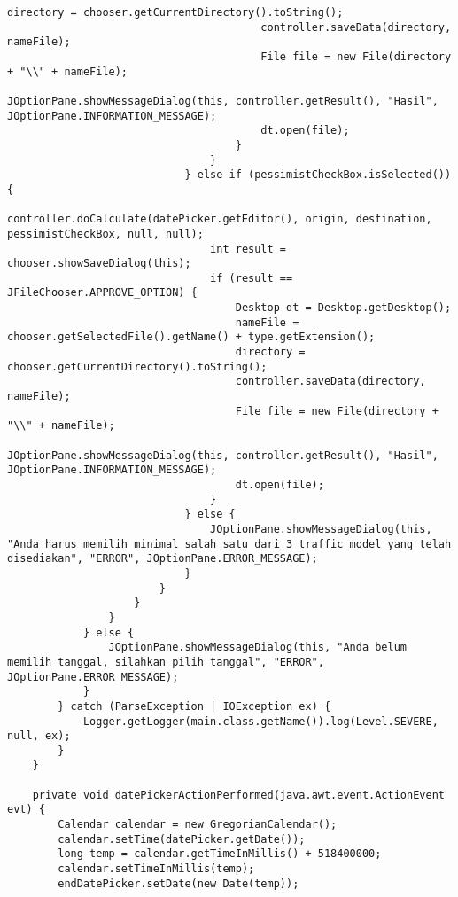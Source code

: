 \begin{lstlisting}[caption= main.java]
                                        directory = chooser.getCurrentDirectory().toString();
                                        controller.saveData(directory, nameFile);
                                        File file = new File(directory + "\\" + nameFile);
                                        JOptionPane.showMessageDialog(this, controller.getResult(), "Hasil", JOptionPane.INFORMATION_MESSAGE);
                                        dt.open(file);
                                    }
                                }
                            } else if (pessimistCheckBox.isSelected()) {
                                controller.doCalculate(datePicker.getEditor(), origin, destination, pessimistCheckBox, null, null);
                                int result = chooser.showSaveDialog(this);
                                if (result == JFileChooser.APPROVE_OPTION) {
                                    Desktop dt = Desktop.getDesktop();
                                    nameFile = chooser.getSelectedFile().getName() + type.getExtension();
                                    directory = chooser.getCurrentDirectory().toString();
                                    controller.saveData(directory, nameFile);
                                    File file = new File(directory + "\\" + nameFile);
                                    JOptionPane.showMessageDialog(this, controller.getResult(), "Hasil", JOptionPane.INFORMATION_MESSAGE);
                                    dt.open(file);
                                }
                            } else {
                                JOptionPane.showMessageDialog(this, "Anda harus memilih minimal salah satu dari 3 traffic model yang telah disediakan", "ERROR", JOptionPane.ERROR_MESSAGE);
                            }
                        }
                    }
                }
            } else {
                JOptionPane.showMessageDialog(this, "Anda belum memilih tanggal, silahkan pilih tanggal", "ERROR", JOptionPane.ERROR_MESSAGE);
            }
        } catch (ParseException | IOException ex) {
            Logger.getLogger(main.class.getName()).log(Level.SEVERE, null, ex);
        }
    }                                          

    private void datePickerActionPerformed(java.awt.event.ActionEvent evt) {                                           
        Calendar calendar = new GregorianCalendar();
        calendar.setTime(datePicker.getDate());
        long temp = calendar.getTimeInMillis() + 518400000;
        calendar.setTimeInMillis(temp);
        endDatePicker.setDate(new Date(temp));


\end{lstlisting}
